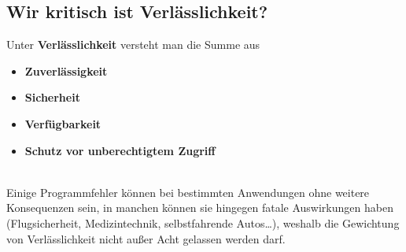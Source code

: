\subsection{Wir kritisch ist Verlässlichkeit?}
Unter \textbf{Verlässlichkeit} versteht man die Summe aus
\begin{itemize}
    \item \textbf{Zuverlässigkeit}
    \item \textbf{Sicherheit}
    \item \textbf{Verfügbarkeit}
    \item \textbf{Schutz vor unberechtigtem Zugriff}
\end{itemize}\\

\noindent
Einige Programmfehler können bei bestimmten Anwendungen ohne weitere Konsequenzen sein, in manchen können sie hingegen fatale Auswirkungen haben (Flugsicherheit, Medizintechnik, selbstfahrende Autos\ldots), weshalb die Gewichtung von Verlässlichkeit nicht außer Acht gelassen werden darf.

